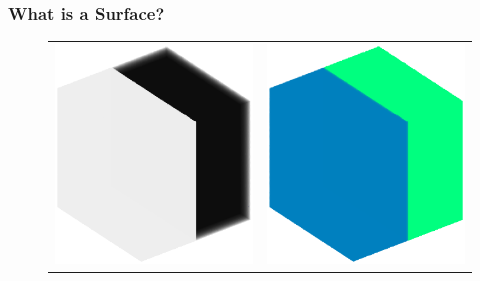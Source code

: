 \documentclass[9pt]{beamer}
\begin{document}
\begin{frame}
		\frametitle{What is a Surface?}
			\begin{figure}
			\begin{tabular}{c c}	
					\includegraphics[scale=0.2]{intensity3d} &
					\includegraphics[scale=0.2]{colourinterface3d}\\

\end{tabular}
\end{figure}
\end{frame}
\end{document}
